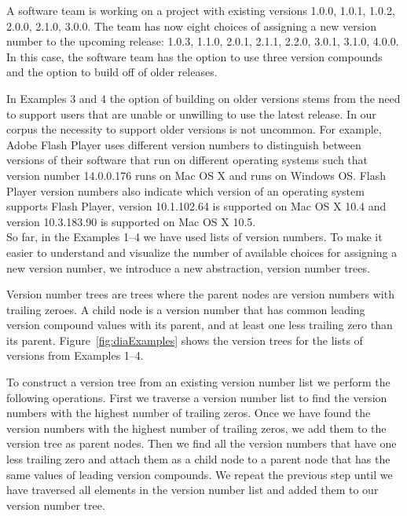 \documentclass[conference]{IEEEtran}
\begin{document}
  A software team  is working on a project with existing versions 1.0.0, 1.0.1, 1.0.2, 2.0.0, 2.1.0, 3.0.0. 
The team has now eight choices of assigning a new version number to the upcoming release: 
1.0.3, 1.1.0, 2.0.1, 2.1.1, 2.2.0, 3.0.1, 3.1.0, 4.0.0. 
In this case, the software team has the option to use three version compounds and the option to build off of older releases. \\




In Examples 3 and 4 the option of building on older versions stems from the need to support users that are unable or unwilling to use the latest release.
In our corpus the necessity to support older versions is not uncommon. 
For example, Adobe Flash Player uses different version numbers to distinguish between versions of their software that run on different operating systems such that version number 14.0.0.176 runs on Mac OS X and  runs on Windows OS.
Flash Player version numbers also indicate which version of an operating system supports Flash Player, version 10.1.102.64 is supported on Mac OS X 10.4 and version 10.3.183.90 is supported on Mac OS X 10.5.
\\

So far, in the Examples 1--4 we have used lists of version numbers. To make it easier to understand and visualize the number of available choices for assigning a new version number, we introduce a new abstraction, version number trees.

Version number trees are trees where the parent nodes are version numbers with trailing zeroes. A child node is a version number that has common leading version compound values with its parent, and at least one less trailing zero than its parent.
Figure~\ref{fig:diaExamples} shows the version trees for the lists of versions from Examples 1--4.

To construct a version tree from an existing version number list we perform the following operations.
First we traverse a version number list to find the version numbers with the highest number of trailing zeros.
Once we have found the version numbers with the highest number of trailing zeros, we add them to the version tree as parent nodes.
Then we find all the version numbers that have one less trailing zero and attach them as a child node to a parent node that has the same values of leading version compounds.
We repeat the previous step until we have traversed all elements in the version number list and added them to our version number tree. \\
\end{document}
